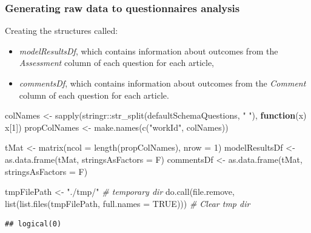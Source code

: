 \documentclass[
]{article}
\newenvironment{Shaded}{\begin{snugshade}}{\end{snugshade}}
\newcommand{\AttributeTok}[1]{\textcolor[rgb]{0.77,0.63,0.00}{#1}}
\newcommand{\CommentTok}[1]{\textcolor[rgb]{0.56,0.35,0.01}{\textit{#1}}}
\newcommand{\ConstantTok}[1]{\textcolor[rgb]{0.00,0.00,0.00}{#1}}
\newcommand{\ControlFlowTok}[1]{\textcolor[rgb]{0.13,0.29,0.53}{\textbf{#1}}}
\newcommand{\DecValTok}[1]{\textcolor[rgb]{0.00,0.00,0.81}{#1}}
\newcommand{\FunctionTok}[1]{\textcolor[rgb]{0.00,0.00,0.00}{#1}}
\newcommand{\NormalTok}[1]{#1}
\newcommand{\OtherTok}[1]{\textcolor[rgb]{0.56,0.35,0.01}{#1}}
\newcommand{\SpecialCharTok}[1]{\textcolor[rgb]{0.00,0.00,0.00}{#1}}
\newcommand{\StringTok}[1]{\textcolor[rgb]{0.31,0.60,0.02}{#1}}
\providecommand{\tightlist}{%
  \setlength{\itemsep}{0pt}\setlength{\parskip}{0pt}}
\begin{document}
\hypertarget{generating-raw-data-to-questionnaires-analysis}{%
\subsubsection{Generating raw data to questionnaires analysis}\label{generating-raw-data-to-questionnaires-analysis}}

Creating the structures called:

\begin{itemize}
\tightlist
\item
  \emph{modelResultsDf}, which contains information about outcomes from the \emph{Assessment} column of each question for each article,
\item
  \emph{commentsDf}, which contains information about outcomes from the \emph{Comment} column of each question for each article.
\end{itemize}

\begin{Shaded}
\begin{Highlighting}[]
\NormalTok{colNames }\OtherTok{\textless{}{-}} \FunctionTok{sapply}\NormalTok{(stringr}\SpecialCharTok{::}\FunctionTok{str\_split}\NormalTok{(defaultSchemaQuestions, }\StringTok{" "}\NormalTok{), }\ControlFlowTok{function}\NormalTok{(x) x[}\DecValTok{1}\NormalTok{])}
\NormalTok{propColNames }\OtherTok{\textless{}{-}} \FunctionTok{make.names}\NormalTok{(}\FunctionTok{c}\NormalTok{(}\StringTok{"workId"}\NormalTok{, colNames))}

\NormalTok{tMat }\OtherTok{\textless{}{-}} \FunctionTok{matrix}\NormalTok{(}\AttributeTok{ncol =} \FunctionTok{length}\NormalTok{(propColNames), }\AttributeTok{nrow =} \DecValTok{1}\NormalTok{)}
\NormalTok{modelResultsDf }\OtherTok{\textless{}{-}} \FunctionTok{as.data.frame}\NormalTok{(tMat, }\AttributeTok{stringsAsFactors =}\NormalTok{ F)}
\NormalTok{commentsDf }\OtherTok{\textless{}{-}} \FunctionTok{as.data.frame}\NormalTok{(tMat, }\AttributeTok{stringsAsFactors =}\NormalTok{ F) }

\NormalTok{tmpFilePath }\OtherTok{\textless{}{-}} \StringTok{"./tmp/"} \CommentTok{\# temporary dir}
\FunctionTok{do.call}\NormalTok{(file.remove, }\FunctionTok{list}\NormalTok{(}\FunctionTok{list.files}\NormalTok{(tmpFilePath, }\AttributeTok{full.names =} \ConstantTok{TRUE}\NormalTok{))) }\CommentTok{\# Clear tmp dir}
\end{Highlighting}
\end{Shaded}

\begin{verbatim}
## logical(0)
\end{verbatim}
\end{document}
